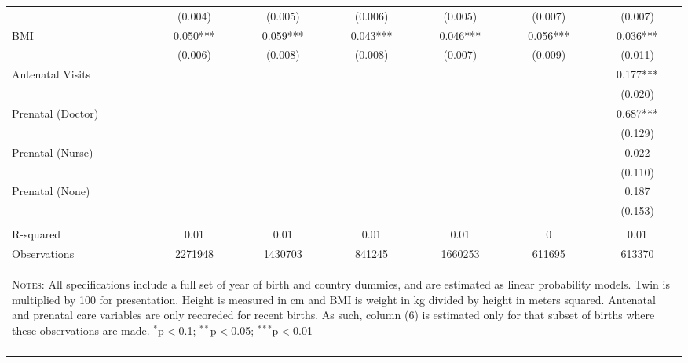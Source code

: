 \begin{landscape}
\begin{table}[htpb!]
\begin{center}
\begin{tabular}{lcccccc}
&(0.004)&(0.005)&(0.006)&(0.005)&(0.007)&(0.007)\\
BMI&0.050***&0.059***&0.043***&0.046***&0.056***&0.036***\\
&(0.006)&(0.008)&(0.008)&(0.007)&(0.009)&(0.011)\\
Antenatal Visits&&&&&&0.177***\\
&&&&&&(0.020)\\
Prenatal (Doctor)&&&&&&0.687***\\
&&&&&&(0.129)\\
Prenatal (Nurse)&&&&&&0.022\\
&&&&&&(0.110)\\
Prenatal (None)&&&&&&0.187\\
&&&&&&(0.153)\\
&&&&&&\\ R-squared&0.01&0.01&0.01&0.01&0&0.01\\
Observations &2271948&1430703&841245&1660253&611695&613370\\
\hline\hline\multicolumn{7}{p{14.3cm}}{\begin{footnotesize}\textsc{Notes:} All specifications include a full set of year of birth and  country dummies, and are estimated as linear probability models.  Twin is multiplied by 100 for presentation.  Height is measured in cm  and BMI is weight in kg divided by height in meters squared.  Antenatal  and prenatal care variables are only recoreded for recent births.  As  such, column (6) is estimated only for that subset of births where  these observations are made.
$^{*}$p$<$0.1; $^{**}$p$<$0.05; $^{***}$p$<$0.01 
\end{footnotesize}}\\ \hline \normalsize\end{tabular} 
\end{center}\end{table}\end{landscape} 
